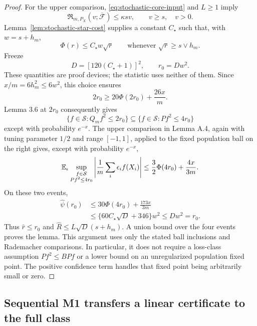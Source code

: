 \begin{proof}
For the upper comparison, \eqref{eq:stochastic-core-input} and
$L\ge1$ imply
\[
 \mathfrak R_{m,P_X}(v;\overline{\mathcal F})
 \le\kappa sv,\qquad v\ge s,\quad v>0.
\]
Lemma~\ref{lem:stochastic-star-cost} supplies a constant $C_\star$
such that, with $w=s+h_m$,
\[
 \Phi(r)\le C_\star w\sqrt r
 \qquad\text{whenever }\sqrt r\ge s\vee h_m.
\]
Freeze
\begin{equation}
 D=[120(C_\star+1)]^2,\qquad r_0=Dw^2.
 \label{eq:stochastic-proof-radius}
\end{equation}
These quantities are proof devices; the statistic uses neither of
them. Since $x/m=6h_m^2\le6w^2$, this choice ensures
\[
 2r_0\ge20\Phi(2r_0)+\frac{26x}{m}.
\]
Lemma 3.6 at $2r_0$ consequently gives
\[
 \{f\in\mathcal S:Q_mf^2\le2r_0\}
 \subseteq\{f\in\mathcal S:Pf^2\le4r_0\}
\]
except with probability $e^{-x}$. The upper comparison in Lemma A.4,
again with tuning parameter $1/2$ and range $[-1,1]$, applied to
the fixed population ball on the right gives, except with
probability $e^{-x}$,
\[
 \mathbb E_\epsilon
 \sup_{\substack{f\in\mathcal S\\Pf^2\le4r_0}}
 \left|\frac1m\sum_i\epsilon_if(X_i)\right|
 \le\frac32\Phi(4r_0)+\frac{4x}{3m}.
\]
On these two events,
\[
 \begin{split}
 \widehat\psi(r_0)
 &\le30\Phi(4r_0)+\frac{173x}{3m}\\
 &\le\{60C_\star\sqrt D+346\}w^2
 \le Dw^2=r_0.
 \end{split}
\]
Thus $\widehat r\le r_0$ and
$\widehat R\le L\sqrt D(s+h_m)$. A union bound over the four
events proves the lemma. This argument uses only the stated ball
inclusions and Rademacher comparisons. In particular, it does not
require a loss-class assumption $Pf^2\le BPf$ or a lower bound on
an unregularized population fixed point. The positive confidence
term handles that fixed point being arbitrarily small or zero.
\end{proof}

\subsection{Sequential M1 transfers a linear certificate to the full class}
\label{app:stochastic-full-transfer}

